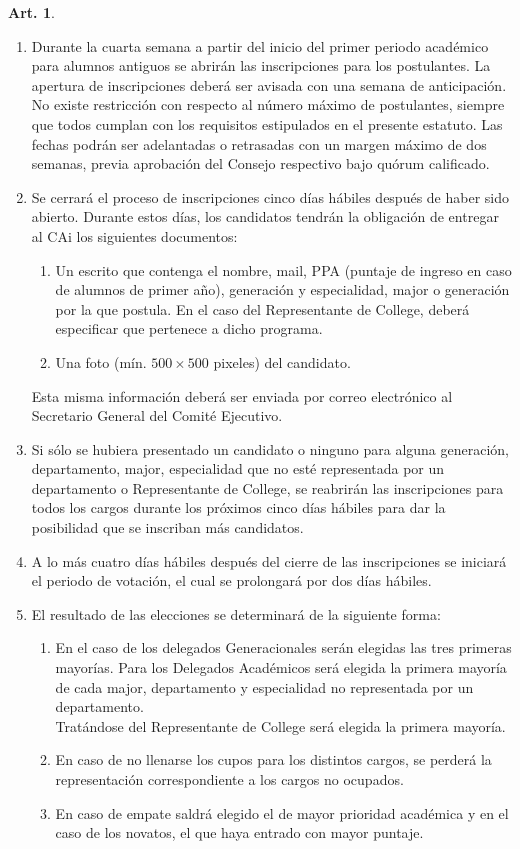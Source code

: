 \documentclass[letterpaper,11pt]{article}
\theoremstyle{definition}%
\newtheorem{art}{Art.} %
\begin{document}
\begin{art}
\begin{enumerate}
		\item Durante la cuarta semana a partir del inicio del primer periodo académico para alumnos antiguos se abrirán las inscripciones para los postulantes. La apertura de inscripciones deberá ser avisada con una semana de anticipación. No existe restricción con respecto al número máximo de postulantes, siempre que todos cumplan con los requisitos estipulados en el presente estatuto. Las fechas podrán ser adelantadas o retrasadas con un margen máximo de dos semanas, previa aprobación del Consejo respectivo bajo quórum calificado.
		\item Se cerrará el proceso de inscripciones cinco días hábiles después de haber sido abierto. Durante estos días, los candidatos tendrán la obligación de entregar al CAi los siguientes documentos:
		      \begin{enumerate}
			      \item Un escrito que contenga el nombre, mail, PPA (puntaje de ingreso en caso de alumnos de primer año), generación y especialidad, major o generación por la que postula.  En el caso del Representante de College, deberá especificar que pertenece a dicho programa.
			      \item Una foto (mín. $500 \times 500$ pixeles) del candidato.
		      \end{enumerate}
		      Esta misma información deberá ser enviada por correo electrónico al Secretario General del Comité Ejecutivo.
		\item Si sólo se hubiera presentado un candidato o ninguno para alguna generación, departamento, major, especialidad que no esté representada por un departamento o Representante de College, se reabrirán las inscripciones para todos los cargos durante los próximos cinco días hábiles para dar la posibilidad que se inscriban más candidatos.
		\item A lo más cuatro días hábiles después del cierre de las inscripciones se iniciará el periodo de votación, el cual se prolongará por dos días hábiles.
		\item El resultado de las elecciones se determinará de la siguiente forma:
		      \begin{enumerate}
			      \item En el caso de los delegados Generacionales serán elegidas las tres primeras mayorías. Para los Delegados Académicos será elegida la primera mayoría de cada major, departamento y especialidad no representada por un departamento.
			            \\
			            Tratándose del Representante de College será elegida la primera mayoría.
			      \item En caso de no llenarse los cupos para los distintos cargos, se perderá la representación correspondiente a los cargos no ocupados.
			      \item En caso de empate saldrá elegido el de mayor prioridad académica y en el caso de los novatos, el que haya entrado con mayor puntaje.
		      \end{enumerate}
	\end{enumerate}
\end{art}
\end{document}
